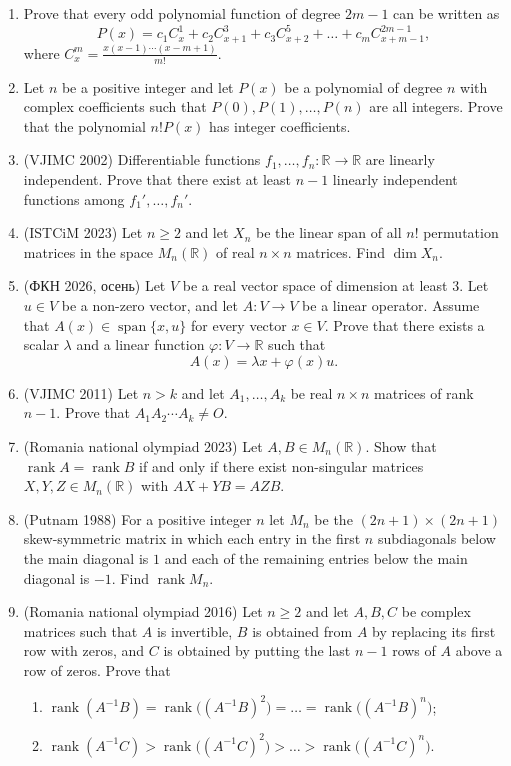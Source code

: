 \documentclass[11pt,a4paper]{article}
\DeclareMathOperator{\rank}{rank}
\DeclareMathOperator{\spn}{span}
\begin{document}
\begin{enumerate}[leftmargin=2.2em,itemsep=0.6em]
\item Prove that every odd polynomial function of degree $2m-1$ can be written as
\[
P(x)=c_1C_x^1+c_2C_{x+1}^3+c_3C_{x+2}^5+\dots+c_mC_{x+m-1}^{2m-1},
\]
where $C_x^m=\frac{x(x-1)\cdots(x-m+1)}{m!}$.

\item Let $n$ be a positive integer and let $P(x)$ be a polynomial of degree $n$ with complex
coefficients such that $P(0),P(1),\dots,P(n)$ are all integers. Prove that the polynomial $n!P(x)$
has integer coefficients.

\item (VJIMC 2002) Differentiable functions $f_1,\dots,f_n\colon\mathbb R\to\mathbb R$ are linearly
independent. Prove that there exist at least $n-1$ linearly independent functions among
$f_1',\dots,f_n'$.

\item (ISTCiM 2023) Let $n\ge2$ and let $X_n$ be the linear span of all $n!$ permutation matrices
in the space $M_n(\mathbb R)$ of real $n\times n$ matrices. Find $\dim X_n$.

\item (ФКН 2026, осень) Let $V$ be a real vector space of dimension at least $3$. Let $u\in V$ be a
non-zero vector, and let $A\colon V\to V$ be a linear operator. Assume that $A(x)\in\spn\{x,u\}$ for
every vector $x\in V$. Prove that there exists a scalar $\lambda$ and a linear function
$\varphi\colon V\to\mathbb R$ such that
\[
A(x)=\lambda x+\varphi(x)u.
\]

\item (VJIMC 2011) Let $n>k$ and let $A_1,\dots,A_k$ be real $n\times n$ matrices of rank $n-1$.
Prove that $A_1A_2\cdots A_k\ne O$.

\item (Romania national olympiad 2023) Let $A,B\in M_n(\mathbb R)$. Show that $\rank A=\rank B$
if and only if there exist non-singular matrices $X,Y,Z\in M_n(\mathbb R)$ with $AX+YB=AZB$.

\item (Putnam 1988) For a positive integer $n$ let $M_n$ be the $(2n+1)\times(2n+1)$
skew-symmetric matrix in which each entry in the first $n$ subdiagonals below the main diagonal
is $1$ and each of the remaining entries below the main diagonal is $-1$. Find $\rank M_n$.

\item (Romania national olympiad 2016) Let $n\ge2$ and let $A,B,C$ be complex matrices such that
$A$ is invertible, $B$ is obtained from $A$ by replacing its first row with zeros, and $C$ is
obtained by putting the last $n-1$ rows of $A$ above a row of zeros. Prove that
\begin{enumerate}[label=\alph*)]
\item $\rank(A^{-1}B)=\rank\bigl((A^{-1}B)^2\bigr)=\dots=\rank\bigl((A^{-1}B)^n\bigr)$;
\item $\rank(A^{-1}C)>\rank\bigl((A^{-1}C)^2\bigr)>\dots>\rank\bigl((A^{-1}C)^n\bigr)$.
\end{enumerate}


\end{enumerate}
\end{document}
